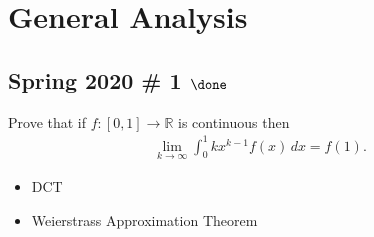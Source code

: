\hypertarget{general-analysis}{%
\section{General Analysis}\label{general-analysis}}

\hypertarget{spring-2020-1-done}{%
\subsection{\texorpdfstring{Spring 2020 \# 1
\(\done\)}{Spring 2020 \# 1 \textbackslash done}}\label{spring-2020-1-done}}

Prove that if \(f: [0, 1] \to {\mathbb{R}}\) is continuous then
\begin{align*}
\lim_{k\to\infty} \int_0^1 kx^{k-1} f(x) \,dx = f(1)
.\end{align*}

\begin{concept}

\envlist

\begin{itemize}
\tightlist
\item
  DCT
\item
  Weierstrass Approximation Theorem
\end{itemize}

\end{concept}

